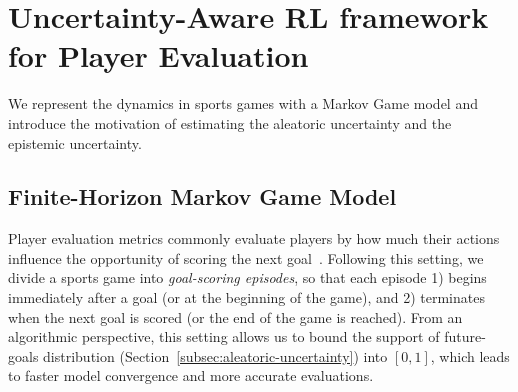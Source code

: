 \documentclass{article}
\newcommand{\dataset}{\mathcal{D}}
\begin{document}
\section{Uncertainty-Aware RL framework for Player Evaluation}
We represent the dynamics in sports games with a Markov Game model and  introduce the motivation of estimating the aleatoric uncertainty and the epistemic uncertainty.
\subsection{Finite-Horizon Markov Game Model}
Player evaluation metrics commonly evaluate players by how much their actions influence the opportunity of scoring the next goal~\cite{Liu2018DRL,Decroos2019Actions,Sun2020Cracking}. Following this setting,  we divide a sports game into {\it goal-scoring episodes}, so that each episode 1) begins immediately after a goal (or at the beginning of the game), and 2) terminates when the next goal is scored (or the end of the game is reached). From an algorithmic perspective, this setting allows us to bound the support of future-goals distribution (Section~\ref{subsec:aleatoric-uncertainty}) into $[0,1]$,
which leads to faster model convergence and more accurate evaluations. 
\end{document}

